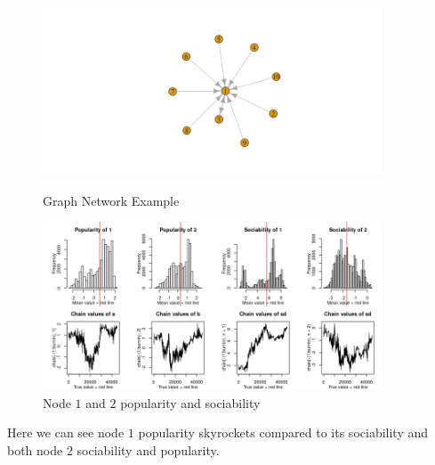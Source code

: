 \documentclass[12pt]{ociamthesis}  %
\begin{document}
	\begin{figure}[H]
		\centering
		\begin{minipage}{\textwidth}
			\centering
			\includegraphics[width=0.9\textwidth]{GraphCovariate1} %
			\caption{Graph Network Example}
			\label{label-image10}
		\end{minipage}\hfill
		\begin{minipage}{\textwidth}
			\centering
			\includegraphics[width=0.9\textwidth]{SimulationCovariates2} %
			\caption{Node $1$ and $2$ popularity and sociability}
			\label{label-image11}
		\end{minipage}
	\end{figure} Here we can see node $1$ popularity skyrockets compared to its sociability and both node $2$ sociability and popularity.
\end{document}
